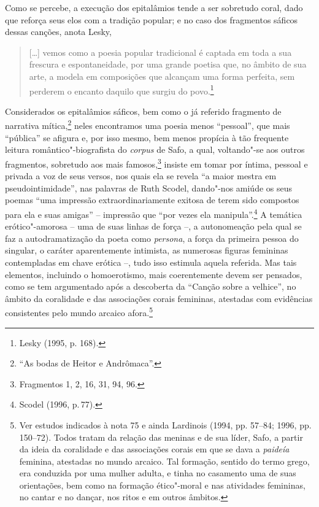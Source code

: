 Como se percebe, a execução dos epitalâmios tende a ser sobretudo coral, dado
que reforça seus elos com a tradição popular; e no caso dos fragmentos sáficos
dessas canções, anota Lesky, 

\begin{quote}
\mbox[\ldots{}] vemos como a poesia popular
tradicional é captada em toda a sua frescura e espontaneidade, por uma grande
poetisa que, no âmbito de sua arte, a modela em composições que alcançam uma
forma perfeita, sem perderem o encanto daquilo que surgiu do povo.\footnote{ Lesky (1995, p. 168).}
\end{quote}

Considerados os epitalâmios sáficos, bem como o já referido fragmento de
narrativa mítica,\footnote{``As bodas de Heitor e Andrômaca''.} neles
encontramos uma poesia menos “pessoal”, que mais ``pública'' se afigura e, por isso mesmo, bem menos propícia à tão frequente leitura romântico"-biografista do \textit{corpus} de
Safo, a qual, voltando"-se aos outros fragmentos, sobretudo aos mais famosos,\footnote{Fragmentos 1, 2, 16, 31, 94, 96.} insiste em tomar por íntima, pessoal e privada a voz de seus versos, nos quais ela se revela “a maior mestra em pseudointimidade”, nas palavras de Ruth Scodel, dando"-nos amiúde os seus poemas “uma impressão extraordinariamente exitosa de terem sido compostos para ela e suas amigas” -- impressão que “por vezes ela manipula”.\footnote{Scodel (1996, p.\,77).}
A temática
erótico"-amorosa -- uma de suas linhas de força --, a autonomeação
pela qual se faz a autodramatização da poeta como \textit{persona}, a força da primeira pessoa do singular, o caráter
aparentemente intimista, as numerosas figuras
femininas contempladas em chave erótica --, tudo isso estimula aquela referida.
Mas tais elementos, incluindo o homoerotismo, mais coerentemente devem ser pensados, como se tem argumentado após a descoberta da ``Canção sobre a velhice'', no âmbito da coralidade e das associações corais femininas, atestadas com evidências consistentes pelo mundo arcaico afora.\footnote{Ver estudos indicados à nota 75 e ainda Lardinois (1994, pp. 57--84; 1996, pp. 150--72). Todos tratam da relação das meninas e de sua líder, Safo, a partir da ideia da coralidade e das associações corais em que se dava a \textit{paideía} feminina, atestadas no mundo arcaico. Tal formação, sentido do termo grego, era conduzida por uma mulher adulta, e tinha no casamento uma de suas orientações, bem como na formação ético"-moral e nas atividades femininas, no cantar e no dançar, nos ritos e em outros âmbitos.} 


